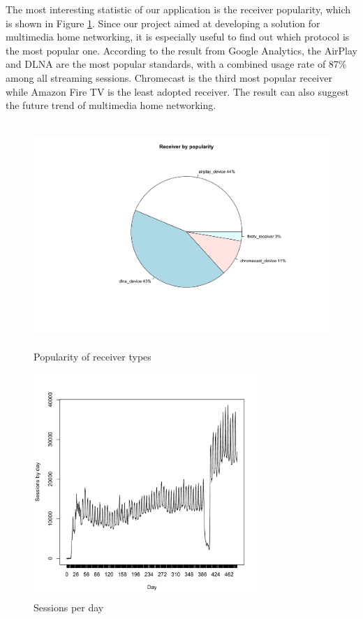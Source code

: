 The most interesting statistic of our application is the receiver popularity, which is shown in Figure \ref{receiver_types}. Since our project aimed at developing a solution for multimedia home networking, it is especially useful to find out which protocol is the most popular one. According to the result from Google Analytics, the AirPlay and DLNA are the most popular standards, with a combined   usage rate of 87\% among all streaming sessions. Chromecast is the third most popular receiver while Amazon Fire TV is the least adopted receiver. The result can also suggest the future trend of multimedia home networking.
\begin{figure}[htb]
\centering \includegraphics[height=8.5cm]{charts/receiver_popularity}
\caption{Popularity of receiver types \label{receiver_types}}
\end{figure}
\begin{figure}[hb]
\centering \includegraphics[height=8.5cm]{charts/sessions_per_day}
\caption{Sessions per day \label{sessions_perday}}
\end{figure}
